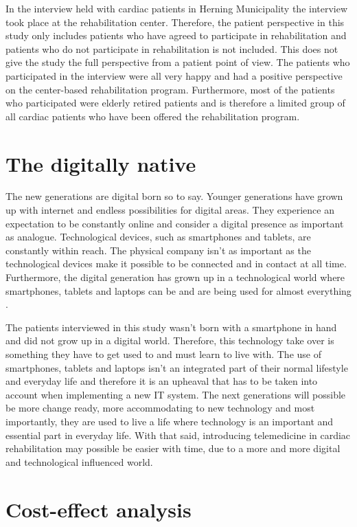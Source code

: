 In the interview held with cardiac patients in Herning Municipality the interview took place at the rehabilitation center. Therefore, the patient perspective in this study only includes patients who have agreed to participate in rehabilitation and patients who do not participate in rehabilitation is not included. This does not give the study the full perspective from a patient point of view. The patients who participated in the interview were all very happy and had a positive perspective on the center-based rehabilitation program. Furthermore, most of the patients who participated were elderly retired patients and is therefore a limited group of all cardiac patients who have been offered the rehabilitation program. 

\section{The digitally native}

The new generations are digital born so to say. Younger generations have grown up with internet and endless possibilities for digital areas. They experience an expectation to be constantly online and consider a digital presence as important as analogue. Technological devices, such as smartphones and tablets, are constantly within reach. The physical company isn’t as important as the technological devices make it possible to be connected and in contact at all time. Furthermore, the digital generation has grown up in a technological world where smartphones, tablets and laptops can be and are being used for almost everything \cite{digital}.

The patients interviewed in this study wasn’t born with a smartphone in hand and did not grow up in a digital world. Therefore, this technology take over is something they have to get used to and must learn to live with. The use of smartphones, tablets and laptops isn’t an integrated part of their normal lifestyle and everyday life and therefore it is an upheaval that has to be taken into account when implementing a new IT system. The next generations will possible be more change ready, more accommodating to new technology and most importantly, they are used to live a life where technology is an important and essential part in everyday life. With that said, introducing telemedicine in cardiac rehabilitation may possible be easier with time, due to a more and more digital and technological influenced world.  


\section{Cost-effect analysis}

